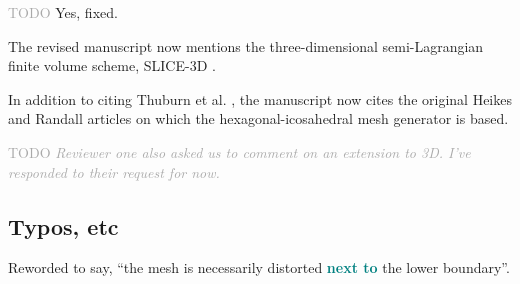 \documentclass[times]{elsarticle}
\newcommand{\TODO}[1]{\textcolor{darkgray}{TODO \textit{#1}}}
\newcommand{\revtwo}[1]{\textcolor{teal}{\textbf{#1}}}
\begin{document}
\begin{quotation}
\begin{comment}
\item P9, last sentence of section 2.1. Should $w_d$ be $m_d$?
\end{comment}
\end{quotation}
\TODO{}
Yes, fixed.

\begin{quotation}
\begin{comment}
\item The discussion of previous work is generally very good. On p2 is it worth mentioning
the SLICE scheme of Zerroukat and co-authors? In the first paragraph of section 3.3, credit
for the hexagonal-icosahedral mesh should probably be given to Heikes and Randall.
\end{comment}
\end{quotation}
The revised manuscript now mentions the three-dimensional semi-Lagrangian finite volume scheme, SLICE-3D \citep{zerroukat-allen2012}.

In addition to citing Thuburn et al. \citep{thuburn2014}, the manuscript now cites the original Heikes and Randall articles \citep{heikes-randall1995a,heikes-randall1995b} on which the hexagonal-icosahedral mesh generator is based.

\begin{quotation}
\begin{comment}
\item Some brief comments on how the approach extends to three dimensions would be
appropriate.
\end{comment}
\end{quotation}
\TODO{Reviewer one also asked us to comment on an extension to 3D.  I've responded to their request for now.}


\subsection*{Typos, etc}

\begin{quotation}
\begin{comment}
\item Introduction, second sentence: `modification of the lower boundary' is an odd way to
think of it.
\end{comment}
\end{quotation}
Reworded to say, ``the mesh is necessarily distorted \revtwo{next to} the lower boundary''.
\end{document}
